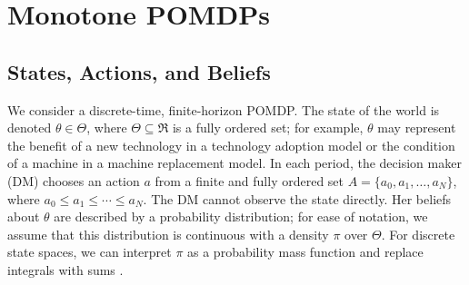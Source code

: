 \section{Monotone POMDPs}\label{sec:model}

\subsection{States, Actions, and Beliefs}\label{sec:setup}

We consider a discrete-time, finite-horizon POMDP. The state of the
world is denoted $\theta \in \Theta$, where $\Theta \subseteq \Re$ is a
fully ordered set; for example, $\theta$ may represent the benefit of a
new technology in a technology adoption model or the condition of a
machine in a machine replacement model. In each period, the decision
maker (DM) chooses an action $a$ from a finite and fully ordered set
$A = \{a_0, a_1, \ldots, a_N\}$, where $a_0 \leq a_1 \leq \cdots \leq
a_N$. The DM cannot observe the state directly. Her beliefs about
$\theta$ are described by a probability distribution; for ease of
notation, we assume that this distribution is continuous with a density
$\pi$ over $\Theta$. For discrete state spaces, we can interpret $\pi$
as a probability mass function and replace integrals with sums
\citep{ulu2009uncertainty}.

